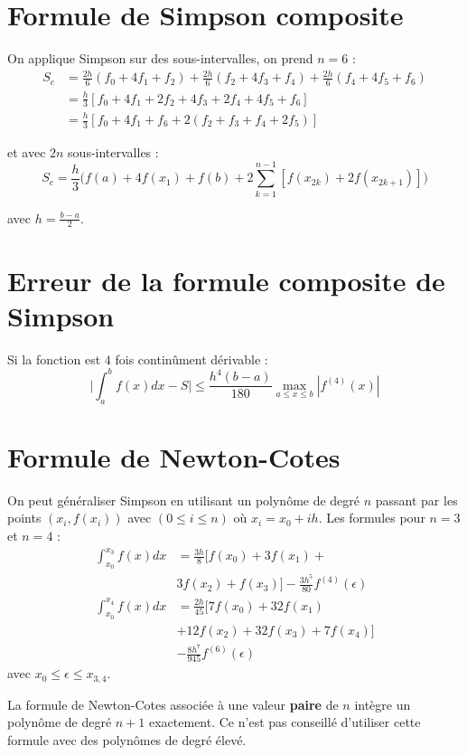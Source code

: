 \documentclass[a4paper,9pt]{extarticle}
\begin{document}
\section{Formule de Simpson composite}

On applique Simpson sur des sous-intervalles, on prend $n=6$ :
\begin{align*}
S_c
 &=\frac{2h}{6}(f_0+4f_1+f_2)+\frac{2h}{6}(f_2+4f_3+f_4)+\frac{2h}{6}(f_4+4f_5+f_6)\\
 &=\frac{h}{3}[f_0+4f_1+2f_2+4f_3+2f_4+4f_5+f_6]\\
 &=\frac{h}{3}[f_0+4f_1+f_6+2(f_2+f_3+f_4+2f_5)]
\end{align*}

et avec $2n$ sous-intervalles :
$$
S_c=\frac{h}{3}\Big(f(a)+4f(x_1)+f(b)+2\sum_{k=1}^{n-1}[f(x_{2k})+2f(x_{2k+1})]\Big)
$$

avec $h=\frac{b-a}{2}$.

\section{Erreur de la formule composite de Simpson}
Si la fonction est $4$ fois continûment dérivable :
$$
\Big|\int_a^bf(x)dx-S\Big| \leq \frac{h^4(b-a)}{180}\max_{a\leq x \leq b}|f^{(4)}(x)|
$$

\section{Formule de Newton-Cotes}
On peut généraliser Simpson en utilisant un polynôme de degré $n$ passant par les points $(x_i,f(x_i))$ avec $(0\leq i\leq n)$ où $x_i=x_0+ih$. Les formules pour $n=3$ et $n=4$ :
\begin{align*}
\int_{x_0}^{x_3}f(x)dx&=\frac{3h}{8}[f(x_0)+3f(x_1)+\\
&3f(x_2)+f(x_3)]-\frac{3h^5}{80}f^{(4)}(\epsilon)\\
\int_{x_0}^{x_4}f(x)dx&=\frac{2h}{45}[7f(x_0)+32f(x_1)\\
&+12f(x_2)+32f(x_3)+7f(x_4)]\\
&-\frac{8h^7}{945}f^{(6)}(\epsilon)
\end{align*}
avec $x_0 \leq \epsilon \leq x_{3,4}$.

La formule de Newton-Cotes associée à une valeur \textbf{paire} de $n$ intègre un polynôme de degré $n+1$ exactement. Ce n'est pas conseillé d'utiliser cette formule avec des polynômes de degré élevé.
\end{document}
